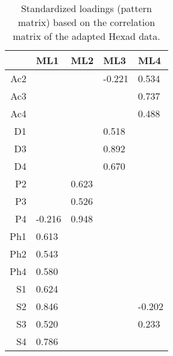 \begin{table}[ht]
\centering
\begin{tabular}{rllll}
  \toprule
 & {\textbf{ML1}} & {\textbf{ML2}} & {\textbf{ML3}} & {\textbf{ML4}} \\ 
  \midrule
Ac2 &        &        & -0.221 &  0.534 \\ 
  Ac3 &        &        &        &  0.737 \\ 
  Ac4 &        &        &        &  0.488 \\ 
  D1 &        &        &  0.518 &        \\ 
  D3 &        &        &  0.892 &        \\ 
  D4 &        &        &  0.670 &        \\ 
  P2 &        &  0.623 &        &        \\ 
  P3 &        &  0.526 &        &        \\ 
  P4 & -0.216 &  0.948 &        &        \\ 
  Ph1 &  0.613 &        &        &        \\ 
  Ph2 &  0.543 &        &        &        \\ 
  Ph4 &  0.580 &        &        &        \\ 
  S1 &  0.624 &        &        &        \\ 
  S2 &  0.846 &        &        & -0.202 \\ 
  S3 &  0.520 &        &        &  0.233 \\ 
  S4 &  0.786 &        &        &        \\ 
   \bottomrule
\end{tabular}
\caption{Standardized loadings (pattern matrix) based on the correlation matrix of the adapted Hexad data.} 
\label{tab:loadingshexfiltered}
\end{table}
